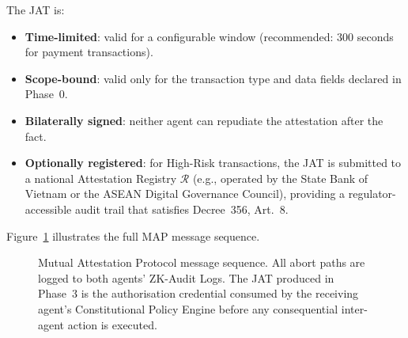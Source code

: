 The JAT is:
\begin{itemize}
  \item \textbf{Time-limited}: valid for a configurable window
        (recommended: 300 seconds for payment transactions).
  \item \textbf{Scope-bound}: valid only for the transaction type and
        data fields declared in Phase~0.
  \item \textbf{Bilaterally signed}: neither agent can repudiate the
        attestation after the fact.
  \item \textbf{Optionally registered}: for High-Risk transactions, the
        JAT is submitted to a national Attestation Registry
        $\mathcal{R}$ (e.g., operated by the State Bank of Vietnam or
        the ASEAN Digital Governance Council), providing a
        regulator-accessible audit trail that satisfies Decree~356,
        Art.~8.
\end{itemize}

Figure~\ref{fig:map-handshake} illustrates the full MAP message sequence.

\begin{figure}[h]
\centering
{}
\caption{Mutual Attestation Protocol message sequence.  All abort paths
         are logged to both agents' ZK-Audit Logs.  The JAT produced in
         Phase~3 is the authorisation credential consumed by the
         receiving agent's Constitutional Policy Engine before any
         consequential inter-agent action is executed.}
\label{fig:map-handshake}
\end{figure}

